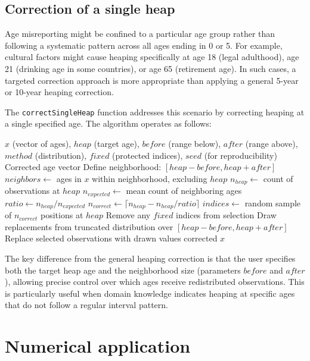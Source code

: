 \documentclass[pdflatex,sn-mathphys-num]{sn-jnl}%
\theoremstyle{thmstyleone}%
\theoremstyle{thmstyletwo}%
\theoremstyle{thmstylethree}%
\begin{document}
\subsection{Correction of a single heap}

Age misreporting might be confined to a particular age group rather than following a systematic pattern across all ages ending in 0 or 5. For example, cultural factors might cause heaping specifically at age 18 (legal adulthood), age 21 (drinking age in some countries), or age 65 (retirement age). In such cases, a targeted correction approach is more appropriate than applying a general 5-year or 10-year heaping correction.

The \texttt{correctSingleHeap} function addresses this scenario by correcting heaping at a single specified age. The algorithm operates as follows:

\begin{algorithm}
\caption{Correct Single Heap}\label{alg:correctSingleHeap}
\begin{algorithmic}[1]
\Require $x$ (vector of ages), $heap$ (target age), $before$ (range below), $after$ (range above), $method$ (distribution), $fixed$ (protected indices), $seed$ (for reproducibility)
\Ensure Corrected age vector
\State Define neighborhood: $[heap - before, heap + after]$
\State $neighbors \gets$ ages in $x$ within neighborhood, excluding $heap$
\State $n_{heap} \gets$ count of observations at $heap$
\State $n_{expected} \gets$ mean count of neighboring ages
\State $ratio \gets n_{heap} / n_{expected}$
    \State $n_{correct} \gets \lceil n_{heap} - n_{heap}/ratio \rceil$
    \State $indices \gets$ random sample of $n_{correct}$ positions at $heap$
    \State Remove any $fixed$ indices from selection
    \State Draw replacements from truncated distribution over $[heap - before, heap + after]$
    \State Replace selected observations with drawn values
\EndIf
\State \Return corrected $x$
\end{algorithmic}
\end{algorithm}

The key difference from the general heaping correction is that the user specifies both the target heap age and the neighborhood size (parameters $before$ and $after$), allowing precise control over which ages receive redistributed observations. This is particularly useful when domain knowledge indicates heaping at specific ages that do not follow a regular interval pattern.


\section{Numerical application}
\end{document}
